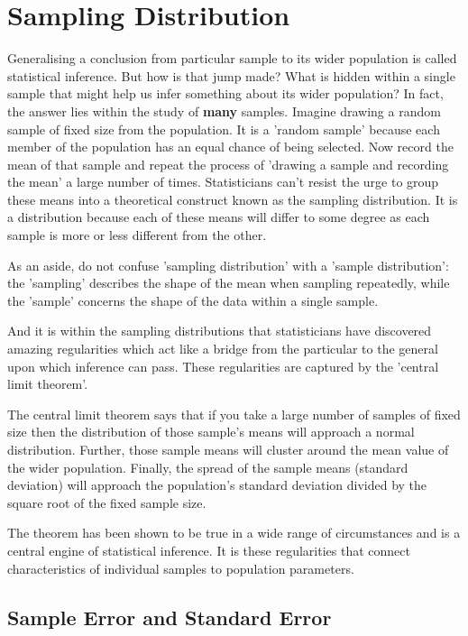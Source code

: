 \documentclass[a4paper,twosided,notoc]{tufte-book}
\begin{document}
\section{Sampling Distribution}
Generalising a conclusion from particular sample to its wider population is called statistical inference. But how is that jump made? What is hidden within a single sample that might help us infer something about its wider population? In fact, the answer lies within the study of \textbf{many} samples. Imagine drawing a random sample of fixed size from the population. It is a 'random sample' because each member of the population has an equal chance of being selected. Now record the mean  of that sample and repeat the process of 'drawing a sample and recording the mean' a large number of times. Statisticians can't resist the urge to group these means into a theoretical construct known as the sampling distribution. It is a distribution because each of these means will differ to some degree as each sample is more or less different from the other.

As an aside, do not confuse 'sampling distribution' with a 'sample distribution': the 'sampling' describes the shape of the mean when sampling repeatedly, while the 'sample' concerns the shape of the data within a single sample.

And it is within the sampling distributions that statisticians have discovered amazing regularities which act like a bridge from the particular to the general upon which inference can pass. These regularities are captured by the 'central limit theorem'.

The central limit theorem says that if you take a large number of samples of fixed size then the distribution of those sample's means will approach a normal distribution. Further, those sample means will cluster around the mean value of the wider population. Finally, the spread of the sample means (standard deviation) will approach the population's standard deviation divided by the square root of the fixed sample size.

The theorem has been shown to be true in a wide range of circumstances and is a central engine of statistical inference. It is these regularities that connect characteristics of individual samples to population parameters.

\subsection{Sample Error and Standard Error}
\end{document}
